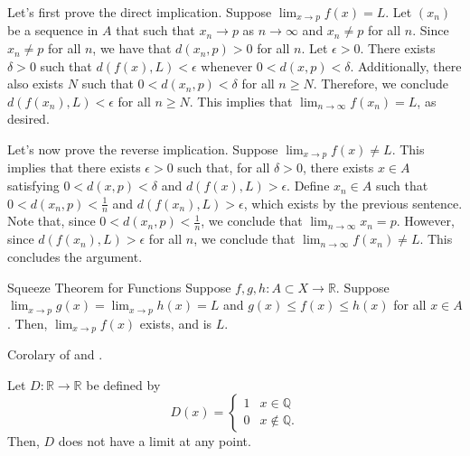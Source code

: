\begin{dem}{}{}
	Let's first prove the direct implication.  Suppose \( \lim_{x \to p} f(x) = L\).
	Let \((x_n)\) be a sequence in \(A\) that such that \(x_n \to p\) as \(n \to \infty\) and \(x_n \neq p\) for all \(n\).
	Since \(x_n \neq p\) for all \(n\), we have that \(d(x_n, p) > 0\) for all \(n\).
	Let \(\epsilon > 0\). There exists \(\delta > 0\) such that \(d(f(x), L) < \epsilon\) whenever \(0 < d(x, p) < \delta\). Additionally, there also exists \(N\) such that \(0 < d(x_n, p) < \delta\) for all \(n \geq N\).
	Therefore, we conclude \(d(f(x_n), L) < \epsilon\) for all \(n \geq N\).
	This implies that \(\lim_{n\to\infty} f(x_n) = L\), as desired.

	Let's now prove the reverse implication. Suppose  \(\lim_{x \to p} f(x) \neq L\). This implies that there exists \(\epsilon > 0\) such that, for all \(\delta > 0\), there exists \(x \in A\) satisfying \(0 < d(x, p) < \delta\) and \(d(f(x), L) > \epsilon\).
	Define \(x_n \in A\) such that \(0 < d(x_n, p) < \frac{1}{n}\) and \(d(f(x_n), L) > \epsilon\), which exists by the previous sentence.
	Note that, since \(0 < d(x_n, p) < \frac{1}{n}\), we conclude that \(\lim_{n\to\infty} x_n = p\). However, since \(d(f(x_n), L) > \epsilon\) for all \(n\), we conclude that \(\lim_{n\to\infty} f(x_n) \neq L\). This concludes the argument.
\end{dem}

\begin{thm}{Squeeze Theorem for Functions}{}
	Suppose \(f, g, h \colon A \subset X \to \mathbb{R}\). Suppose \(\lim_{x \to p} g(x) = \lim_{x\to p} h(x) = L\) and \(g(x) \leq f(x) \leq h(x)\) for all \(x \in A\).
	Then, \(\lim_{x\to p}f(x)\) exists, and is \(L\).
\end{thm}

\begin{dem}{}{}
	Corolary of  and .
\end{dem}

\begin{exmp}{}{}
	Let \(D \colon \mathbb{R} \to \mathbb{R}\) be defined by \[
		D(x) = 
		\begin{cases}
			1 & x \in \mathbb{Q} \\
			0 & x \notin \mathbb{Q}.
		\end{cases}
	\]
	Then, \(D\) does not have a limit at any point.
\end{exmp}
